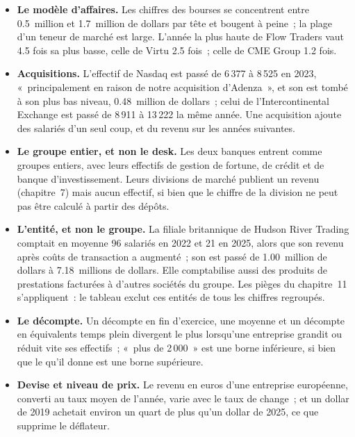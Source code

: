 \begin{itemize}
\item \textbf{Le modèle d'affaires.} Les chiffres des bourses se concentrent entre 0.5~million et 1.7~million de dollars par tête et
bougent à peine~; la plage d'un teneur de marché est large. L'année la plus haute de Flow Traders vaut 4.5 fois sa plus basse, celle de Virtu 2.5 fois~;
celle de CME Group 1.2 fois.
\item \textbf{Acquisitions.} L'effectif de Nasdaq est passé de 6\,377 à 8\,525 en 2023, «~principalement en raison de notre acquisition
d'Adenza~», et son  est tombé à son plus bas niveau, 0.48~million de dollars~; celui de l'Intercontinental Exchange est passé de
8\,911 à 13\,222 la même année. Une acquisition ajoute des salariés d'un seul coup, et du revenu sur les années suivantes.
\item \textbf{Le groupe entier, et non le desk.} Les deux banques entrent comme groupes entiers, avec leurs effectifs de gestion de fortune, de crédit et
de banque d'investissement. Leurs divisions de marché publient un revenu (chapitre~7) mais aucun effectif, si bien que le
chiffre de la division ne peut pas être calculé à partir des dépôts.
\item \textbf{L'entité, et non le groupe.} La filiale britannique de Hudson River Trading comptait en moyenne 96 salariés en 2022 et 21
en 2025, alors que son revenu après coûts de transaction a augmenté~; son  est passé de 1.00~million de dollars à 7.18~millions de dollars.
Elle comptabilise aussi des produits de prestations facturées à d'autres sociétés du groupe. Les pièges du chapitre~11 s'appliquent~: le tableau exclut ces entités
de tous les chiffres regroupés.
\item \textbf{Le décompte.} Un décompte en fin d'exercice, une moyenne et un décompte en équivalents temps plein divergent le plus lorsqu'une
entreprise grandit ou réduit vite ses effectifs~; «~plus de 2\,000~» est une borne inférieure, si bien que le  qu'il donne est une borne supérieure.
\item \textbf{Devise et niveau de prix.} Le revenu en euros d'une entreprise européenne, converti au taux moyen de l'année, varie avec
le taux de change~; et un dollar de 2019 achetait environ un quart de plus qu'un dollar de 2025, ce que supprime le déflateur.
\end{itemize}

